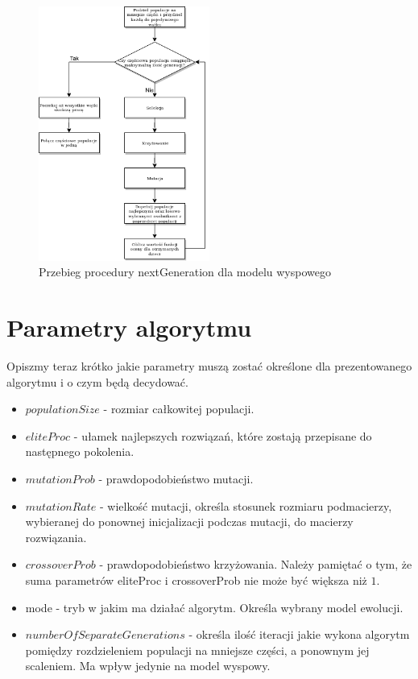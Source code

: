 \begin{figure}[H]
    \centering        
    \includegraphics[width=0.5\textwidth]{img/next_gen_wyspowy.png}
    \caption{Przebieg procedury nextGeneration dla modelu wyspowego}
    \label{next_gen_wyspowy_img}
\end{figure}


\section{Parametry algorytmu}
Opiszmy teraz krótko jakie parametry muszą zostać określone dla prezentowanego algorytmu i o czym będą decydować.

\begin{itemize}
    \item $populationSize$ - rozmiar całkowitej populacji.
    \item $eliteProc$ - ułamek najlepszych rozwiązań, które zostają przepisane do następnego pokolenia.
    \item $mutationProb$ - prawdopodobieństwo mutacji.
    \item $mutationRate$ - wielkość mutacji, określa stosunek rozmiaru podmacierzy, wybieranej do ponownej inicjalizacji podczas mutacji, 
    do macierzy rozwiązania.
    \item $crossoverProb$ - prawdopodobieństwo krzyżowania. Należy pamiętać o tym, że suma parametrów eliteProc i crossoverProb nie 
    może być większa niż $1$.
    \item mode - tryb w jakim ma działać algorytm. Określa wybrany model ewolucji.
    \item $numberOfSeparateGenerations$ - określa ilość iteracji jakie wykona algorytm pomiędzy rozdzieleniem populacji na 
    mniejsze części, a ponownym jej scaleniem. Ma wpływ jedynie na model wyspowy. 
\end{itemize}


